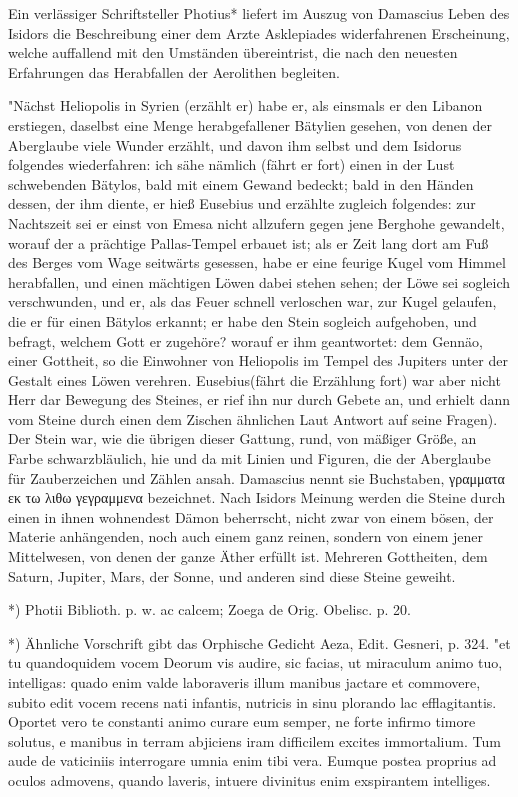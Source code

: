 \documentclass[a4paper, 11pt, oneside, polutonikogreek, german]{article}
\begin{document}
Ein verlässiger Schriftsteller Photius* liefert im Auszug von Damascius Leben des Isidors die Beschreibung einer dem Arzte Asklepiades widerfahrenen Erscheinung, welche auffallend mit den Umständen übereintrist, die nach den neuesten Erfahrungen das Herabfallen der Aerolithen begleiten.

"Nächst Heliopolis in Syrien (erzählt er) habe er, als einsmals er den Libanon erstiegen, daselbst eine Menge herabgefallener Bätylien gesehen, von denen der Aberglaube viele Wunder erzählt, und davon ihm selbst und dem Isidorus folgendes wiederfahren: ich sähe nämlich (fährt er fort) einen in der Lust schwebenden Bätylos, bald mit einem Gewand bedeckt; bald in den Händen dessen, der ihm diente, er hieß Eusebius und erzählte zugleich folgendes: zur Nachtszeit sei er einst von Emesa nicht allzufern gegen jene Berghohe gewandelt, worauf der a prächtige Pallas-Tempel erbauet ist; als er Zeit lang dort am Fuß des Berges vom Wage seitwärts gesessen, habe er eine feurige Kugel vom Himmel herabfallen, und einen mächtigen Löwen dabei stehen sehen; der Löwe sei sogleich verschwunden, und er, als das Feuer schnell verloschen war, zur Kugel gelaufen, die er für einen Bätylos erkannt; er habe den Stein sogleich aufgehoben, und befragt, welchem Gott er zugehöre? worauf er ihm geantwortet: dem Gennäo, einer Gottheit, so die Einwohner von Heliopolis im Tempel des Jupiters unter der Gestalt eines Löwen verehren. Eusebius(fährt die Erzählung fort) war aber nicht Herr dar Bewegung des Steines, er rief ihn nur durch Gebete an, und erhielt dann vom Steine durch einen dem Zischen ähnlichen Laut Antwort auf seine Fragen). Der Stein war, wie die übrigen dieser Gattung, rund, von mäßiger Größe, an Farbe schwarzbläulich, hie und da mit Linien und Figuren, die der Aberglaube für Zauberzeichen und Zählen ansah. Damascius nennt sie Buchstaben, γραμματα εκ τω λιθω γεγραμμενα bezeichnet. Nach Isidors Meinung werden die Steine durch einen in ihnen wohnendest Dämon beherrscht, nicht zwar von einem bösen, der Materie anhängenden, noch auch einem ganz reinen, sondern von einem jener Mittelwesen, von denen der ganze Äther erfüllt ist. Mehreren Gottheiten, dem Saturn, Jupiter, Mars, der Sonne, und anderen sind diese Steine geweiht.

*) Photii Biblioth. p. w. ac calcem; Zoega de Orig. Obelisc. p. 20.

*) Ähnliche Vorschrift gibt das Orphische Gedicht Aeza, Edit. Gesneri, p. 324. "et tu quandoquidem vocem Deorum vis audire, sic facias, ut miraculum animo tuo, intelligas: quado enim valde laboraveris illum manibus jactare et commovere, subito edit vocem recens nati infantis, nutricis in sinu plorando lac efflagitantis. Oportet vero te constanti animo curare eum semper, ne forte infirmo timore solutus, e manibus in terram abjiciens iram difficilem excites immortalium. Tum aude de vaticiniis interrogare umnia enim tibi vera. Eumque postea proprius ad oculos admovens, quando laveris, intuere divinitus enim exspirantem intelliges.
\end{document}
